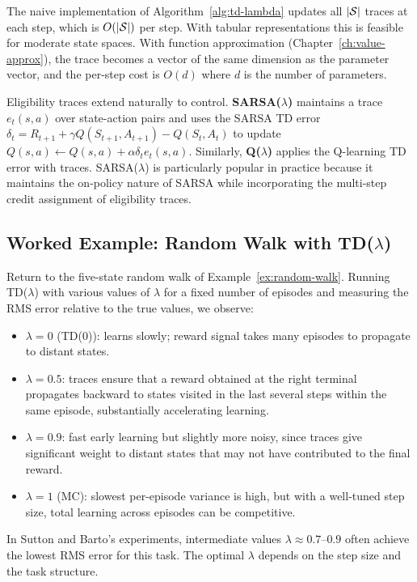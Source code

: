 \begin{remark}
The naive implementation of Algorithm~\ref{alg:td-lambda} updates all $|\mathcal{S}|$ traces at each step, which is $O(|\mathcal{S}|)$ per step.  With tabular representations this is feasible for moderate state spaces.  With function approximation (Chapter~\ref{ch:value-approx}), the trace becomes a vector of the same dimension as the parameter vector, and the per-step cost is $O(d)$ where $d$ is the number of parameters.
\end{remark}

\begin{remark}
Eligibility traces extend naturally to control.  \textbf{SARSA($\lambda$)} maintains a trace $e_t(s,a)$ over state-action pairs and uses the SARSA TD error $\delta_t = R_{t+1}+\gamma Q(S_{t+1},A_{t+1})-Q(S_t,A_t)$ to update $Q(s,a) \leftarrow Q(s,a)+\alpha\delta_t e_t(s,a)$.  Similarly, \textbf{Q($\lambda$)} applies the Q-learning TD error with traces.  SARSA($\lambda$) is particularly popular in practice because it maintains the on-policy nature of SARSA while incorporating the multi-step credit assignment of eligibility traces.
\end{remark}

\subsection{Worked Example: Random Walk with TD($\lambda$)}

\begin{example}
Return to the five-state random walk of Example~\ref{ex:random-walk}.  Running TD($\lambda$) with various values of $\lambda$ for a fixed number of episodes and measuring the RMS error relative to the true values, we observe:
\begin{itemize}[leftmargin=*]
  \item $\lambda=0$ (TD(0)): learns slowly; reward signal takes many episodes to propagate to distant states.
  \item $\lambda=0.5$: traces ensure that a reward obtained at the right terminal propagates backward to states visited in the last several steps within the same episode, substantially accelerating learning.
  \item $\lambda=0.9$: fast early learning but slightly more noisy, since traces give significant weight to distant states that may not have contributed to the final reward.
  \item $\lambda=1$ (MC): slowest per-episode variance is high, but with a well-tuned step size, total learning across episodes can be competitive.
\end{itemize}
In Sutton and Barto's experiments, intermediate values $\lambda\approx 0.7$--$0.9$ often achieve the lowest RMS error for this task.  The optimal $\lambda$ depends on the step size and the task structure.
\end{example}

